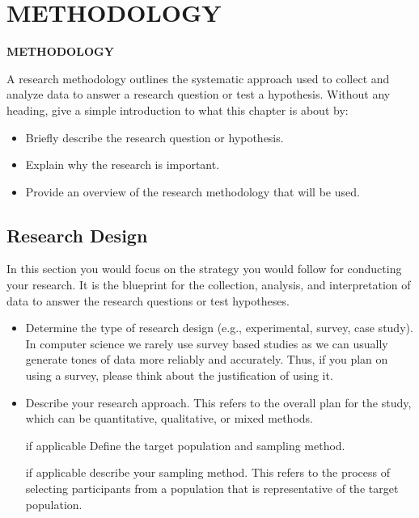\chapter{METHODOLOGY}
\pagebreak

\begin{center}
{\LARGE\textbf{METHODOLOGY}}
\end{center}

A research methodology outlines the systematic approach used to collect and analyze data to answer a research question or test a hypothesis. Without any heading, give a simple introduction to what this chapter is about by:
\begin{itemize}
    \item Briefly describe the research question or hypothesis.
    \item Explain why the research is important.
    \item Provide an overview of the research methodology that will be used.
\end{itemize}


\section{Research Design} %
\label{sec:research_design}

In this section you would focus on the strategy you would follow for conducting your research. 
It is the blueprint for the collection, analysis, and interpretation of data to answer the research questions or test hypotheses.

\begin{itemize}
    \item Determine the type of research design (e.g., experimental, survey, case study). In computer science we rarely use survey based studies as we can usually generate tones of data more reliably and accurately. Thus, if you plan on using a survey, please think about the justification of using it.
    \item Describe your research approach. This refers to the overall plan for the study, which can be quantitative, qualitative, or mixed methods.
    \item [if applicable] Define the target population and sampling method.
    \item [if applicable] describe your sampling method. This refers to the process of selecting participants from a population that is representative of the target population.
\end{itemize}

